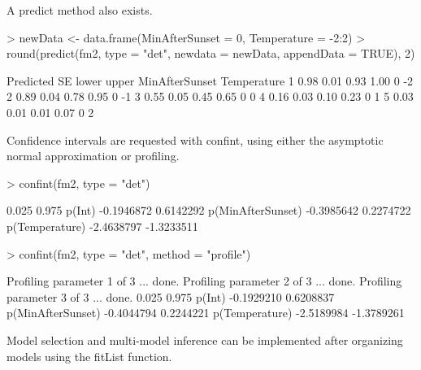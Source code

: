 \documentclass[a4paper]{article}
\renewenvironment{Schunk}{\vspace{\topsep}}{\vspace{\topsep}}
\begin{document}
A predict method also exists.

\begin{Schunk}
\begin{Sinput}
> newData <- data.frame(MinAfterSunset = 0, Temperature = -2:2)
> round(predict(fm2, type = "det", newdata = newData, appendData = TRUE), 
     2)
\end{Sinput}
\begin{Soutput}
  Predicted   SE lower upper MinAfterSunset Temperature
1      0.98 0.01  0.93  1.00              0          -2
2      0.89 0.04  0.78  0.95              0          -1
3      0.55 0.05  0.45  0.65              0           0
4      0.16 0.03  0.10  0.23              0           1
5      0.03 0.01  0.01  0.07              0           2
\end{Soutput}
\end{Schunk}


Confidence intervals are requested with confint, using either the
asymptotic normal approximation or profiling.


\begin{Schunk}
\begin{Sinput}
> confint(fm2, type = "det")
\end{Sinput}
\begin{Soutput}
                       0.025      0.975
p(Int)            -0.1946872  0.6142292
p(MinAfterSunset) -0.3985642  0.2274722
p(Temperature)    -2.4638797 -1.3233511
\end{Soutput}
\begin{Sinput}
> confint(fm2, type = "det", method = "profile")
\end{Sinput}
\begin{Soutput}
Profiling parameter 1 of 3 ... done.
Profiling parameter 2 of 3 ... done.
Profiling parameter 3 of 3 ... done.
                       0.025      0.975
p(Int)            -0.1929210  0.6208837
p(MinAfterSunset) -0.4044794  0.2244221
p(Temperature)    -2.5189984 -1.3789261
\end{Soutput}
\end{Schunk}

Model selection and multi-model inference can be implemented after
organizing models using the fitList function.
\end{document}
